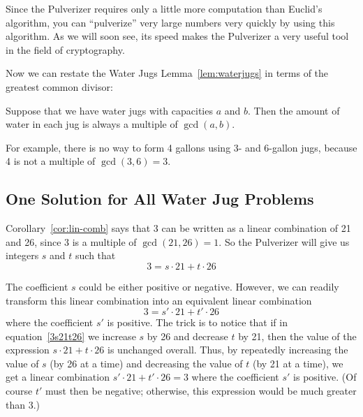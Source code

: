 Since the Pulverizer requires only a little more computation than
Euclid's algorithm, you can ``pulverize'' very large numbers very
quickly by using this algorithm.  As we will soon see, its speed makes
the Pulverizer a very useful tool in the field of cryptography.

Now we can restate the Water Jugs Lemma~\ref{lem:waterjugs} in terms
of the greatest common divisor:
\begin{corollary}\label{cor:waterjugs}
Suppose that we have water jugs with capacities $a$ and $b$.  Then the
amount of water in each jug is always a multiple of $\gcd(a, b)$.
\end{corollary}

For example, there is no way to form 4 gallons using 3- and 6-gallon
jugs, because 4 is not a multiple of $\gcd(3, 6) = 3$.

\subsection{One Solution for All Water Jug Problems}\label{all_jugs_son_sec}

Corollary~\ref{cor:lin-comb} says that 3 can be written as a linear
combination of 21 and 26, since 3 is a multiple of $\gcd(21, 26) = 1$.
So the Pulverizer will give us integers $s$ and $t$ such that
\begin{equation}\label{3s21t26}
3 = s \cdot 21 + t \cdot 26
\end{equation}

The coefficient $s$ could be either positive or negative.
However, we can readily transform this linear combination into an
equivalent linear combination
\begin{equation}\label{3sprime21}
3 = s' \cdot 21 + t' \cdot 26
\end{equation}
where the coefficient $s'$ is positive.  The trick is to notice that
if in equation~\eqref{3s21t26} we increase $s$ by 26 and decrease $t$
by 21, then the value of the expression $s \cdot 21 + t \cdot 26$ is
unchanged overall.  Thus, by repeatedly increasing the value of $s$
(by 26 at a time) and decreasing the value of $t$ (by 21 at a time),
we get a linear combination $s' \cdot 21 + t' \cdot 26 = 3$ where the
coefficient $s'$ is positive.  (Of course $t'$ must then be negative;
otherwise, this expression would be much greater than 3.)

